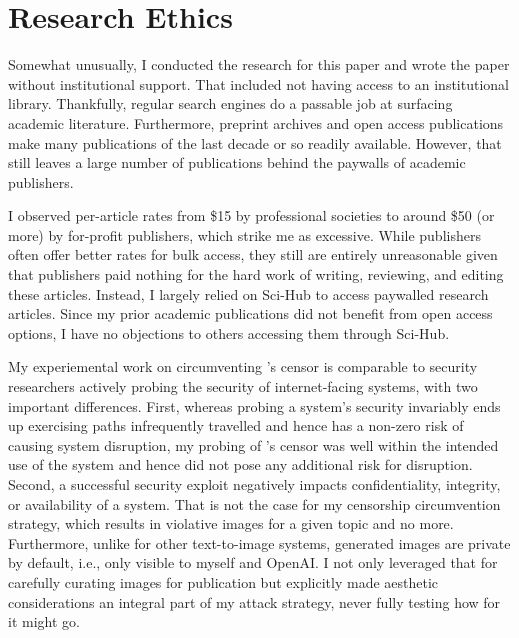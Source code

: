 \section{Research Ethics}
\label{app:research-ethics}

Somewhat unusually, I conducted the research for this paper and wrote the paper
without institutional support. That included not having access to an
institutional library. Thankfully, regular search engines do a passable job at
surfacing academic literature. Furthermore, preprint archives and open access
publications make many publications of the last decade or so readily available.
However, that still leaves a large number of publications behind the paywalls of
academic publishers.

I observed per-article rates from \$15 by professional societies to around \$50
(or more) by for-profit publishers, which strike me as excessive. While
publishers often offer better rates for bulk access, they still are entirely
unreasonable given that publishers paid nothing for the hard work of writing,
reviewing, and editing these articles. Instead, I largely relied on Sci-Hub to
access paywalled research articles. Since my prior academic publications did not
benefit from open access options, I have no objections to others accessing them
through Sci-Hub.

My experiemental work on circumventing \DALLE's censor is comparable to security
researchers actively probing the security of internet-facing systems, with two
important differences. First, whereas probing a system's security invariably
ends up exercising paths infrequently travelled and hence has a non-zero risk of
causing system disruption, my probing of \DALLE's censor was well within the
intended use of the system and hence did not pose any additional risk for
disruption. Second, a successful security exploit negatively impacts
confidentiality, integrity, or availability of a system. That is not the case
for my censorship circumvention strategy, which results in violative images for
a given topic and no more. Furthermore, unlike for other text-to-image systems,
generated images are private by default, i.e., only visible to myself and
OpenAI. I not only leveraged that for carefully curating images for publication
but explicitly made aesthetic considerations an integral part of my attack
strategy, never fully testing how for it might go.

